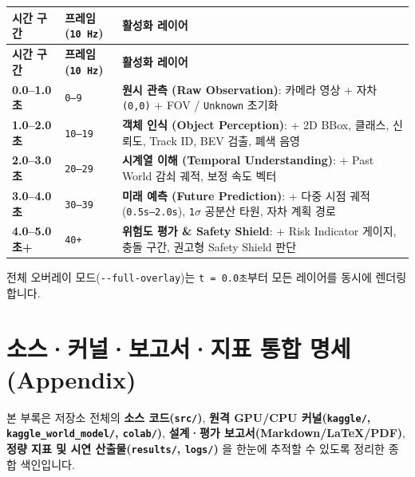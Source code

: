 \documentclass[10.5pt,a4paper]{article}
\begin{document}
\begin{footnotesize}
\setlength{\tabcolsep}{4pt}
\setlength{\LTleft}{0pt}\setlength{\LTright}{0pt}
\begin{longtable}{>{\raggedright\arraybackslash}p{} >{\raggedright\arraybackslash}p{} >{\raggedright\arraybackslash}p{}}
\toprule
\textbf{시간 구간} & \textbf{프레임 (\texttt{10 Hz})} & \textbf{활성화 레이어} \\
\midrule
\endfirsthead
\toprule
\textbf{시간 구간} & \textbf{프레임 (\texttt{10 Hz})} & \textbf{활성화 레이어} \\
\midrule
\endhead
\bottomrule
\endfoot
\textbf{0.0--1.0초} & \texttt{0--9} & \textbf{원시 관측 (Raw Observation)}: 카메라 영상 + 자차 \texttt{(0,\allowbreak{}0)} + FOV / \texttt{Unknown} 초기화 \\
\textbf{1.0--2.0초} & \texttt{10--19} & \textbf{객체 인식 (Object Perception)}: + 2D BBox, 클래스, 신뢰도, Track ID, BEV 검출, 폐색 음영 \\
\textbf{2.0--3.0초} & \texttt{20--29} & \textbf{시계열 이해 (Temporal Understanding)}: + Past World 감쇠 궤적, 보정 속도 벡터 \\
\textbf{3.0--4.0초} & \texttt{30--39} & \textbf{미래 예측 (Future Prediction)}: + 다중 시점 궤적(\texttt{0.\allowbreak{}5s--2.\allowbreak{}0s}), \texttt{1$\sigma$} 공분산 타원, 자차 계획 경로 \\
\textbf{4.0--5.0초+} & \texttt{40+} & \textbf{위험도 평가 \& Safety Shield}: + Risk Indicator 게이지, 충돌 구간, 권고형 Safety Shield 판단 \\
\end{longtable}
\end{footnotesize}


전체 오버레이 모드(\texttt{-\allowbreak{}-\allowbreak{}full-\allowbreak{}overlay})는 \texttt{t = 0.\allowbreak{}0초}부터 모든 레이어를 동시에 렌더링합니다.

\newpage
\section{소스·커널·보고서·지표 통합 명세 (Appendix)}

본 부록은 저장소 전체의 \textbf{소스 코드(\texttt{src/\allowbreak{}})}, \textbf{원격 GPU/CPU 커널(\texttt{kaggle/\allowbreak{}}, \texttt{kaggle\_\allowbreak{}world\_\allowbreak{}model/\allowbreak{}}, \texttt{colab/\allowbreak{}})}, \textbf{설계·평가 보고서(Markdown/LaTeX/PDF)}, \textbf{정량 지표 및 시연 산출물(\texttt{results/\allowbreak{}}, \texttt{logs/\allowbreak{}})} 을 한눈에 추적할 수 있도록 정리한 종합 색인입니다.
\end{document}
